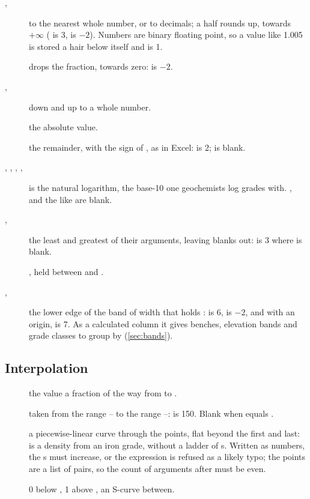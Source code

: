 \begin{description}
\item[, ] to the nearest whole number, or to  decimals; a half
rounds up, towards $+\infty$ ( is 3,  is $-2$). Numbers are binary
floating point, so a value like 1.005 is stored a hair below itself and  is 1.
\item[] drops the fraction, towards zero:  is $-2$.
\item[, ] down and up to a whole number.
\item[] the absolute value.
\item[] the remainder, with the sign of , as in Excel:  is 2;
 is blank.
\item[, , , , ]  is the natural
logarithm,  the base-10 one geochemists log grades with. ,  and
the like are blank.
\item[, ] the least and greatest of their arguments, leaving blanks out:
 is 3 where  is blank.
\item[] , held between  and .
\item[, ] the lower edge of the band of width  that
holds :  is 6,  is $-2$, and with an origin,
 is 7. As a calculated column it gives benches, elevation bands and grade classes to
group by (\cref{sec:bands}).
\end{description}

\subsection{Interpolation}

\begin{description}
\item[] the value a fraction  of the way from  to .
\item[]  taken from the range – to the range
–:  is 150. Blank when  equals .
\item[] a piecewise-linear curve through the points, flat beyond the
first and last:  is a density from an iron grade,
without a ladder of s. Written as numbers, the s must increase, or the expression is
refused as a likely typo; the points are a list of pairs, so the count of arguments after  must
be even.
\item[] 0 below , 1 above , an S-curve between.
\end{description}

